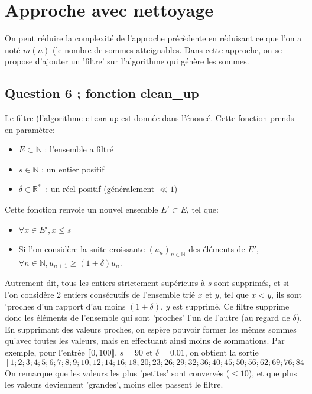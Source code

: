 \documentclass[10pt]{article}
\begin{document}
	\newpage
	\section{Approche avec nettoyage}\label{approche_naive}
		On peut réduire la complexité de l'approche précèdente en réduisant ce que l'on a noté $m(n)$ (le nombre de sommes atteignables.
		Dans cette approche, on se propose d'ajouter un 'filtre' sur l'algorithme qui génère les sommes.
			\subsection{Question 6 ; fonction clean\_up}
				Le filtre (l'algorithme $\mathtt{clean\_up}$ est donnée dans l'énoncé. Cette fonction prends en paramètre:
				\begin{itemize}[label=-]
					\setlength\itemsep{0.1em}
					\item $E \subset \mathbb{N}$ : l'ensemble a filtré
					\item $s \in \mathbb{N}$ : un entier positif
					\item $\delta \in \mathbb{R}_+^*$ : un réel positif (généralement $\ll 1$)
				\end{itemize}
				Cette fonction renvoie un nouvel ensemble $E' \subset E$, tel que:
				\begin{itemize}[label=-]
					\setlength\itemsep{0.1em}
					\item	$\forall x \in E' , x \leq s$
					\item	Si l'on considère la suite croissante $(u_n)_{n \in \mathbb{N}}$ des éléments de $E'$,
							$\forall n \in \mathbb{N}, u_{n + 1} \geq (1 + \delta)u_n $.
				\end{itemize}
	
				Autrement dit, tous les entiers strictement supérieurs à $s$ sont supprimés, et 
				si l'on considère 2 entiers consécutifs de l'ensemble trié $x$ et $y$, tel que $x < y$,
				ils sont 'proches d'un rapport d'au moins $(1 + \delta)$, $y$ est supprimé.
				Ce filtre supprime donc les éléments de l'ensemble qui sont 'proches' l'un de l'autre (au regard de $\delta$).
				En supprimant des valeurs proches, on espère pouvoir former les mêmes sommes qu'avec toutes les valeurs,
				mais en effectuant ainsi moins de sommations.
				\newline
				\newline
				Par exemple, pour l'entrée $\llbracket 0, 100 \rrbracket$, $s = 90$ et $\delta=0.01$, on obtient la sortie
				$$[1; 2; 3; 4; 5; 6; 7; 8; 9; 10; 12; 14; 16; 18; 20; 23; 26; 29; 32; 36; 40; 45; 50; 56; 62; 69; 76; 84]$$
				On remarque que les valeurs les plus 'petites' sont convervés ($\leq 10$), et que plus les valeurs deviennent 'grandes',
				moins elles passent le filtre.
				
\end{document}
